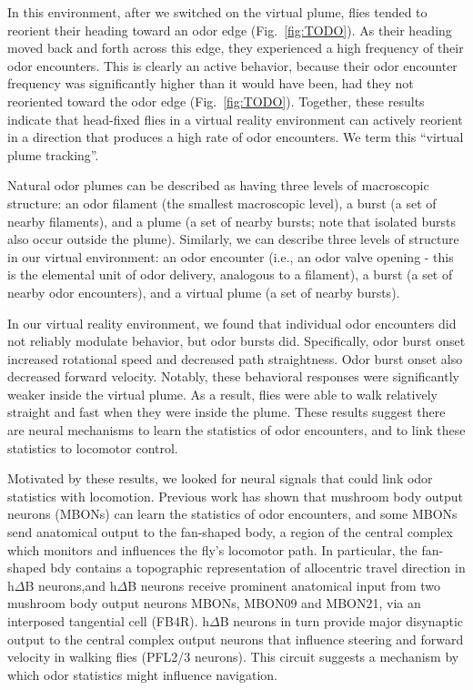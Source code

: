 In this environment, after we switched on the virtual plume, flies tended to reorient their heading toward an odor edge (Fig.~\ref{fig:TODO}). %
As their heading moved back and forth across this edge, they experienced a high frequency of their odor encounters. This is clearly an active behavior, because their odor encounter frequency was significantly higher than it would have been, had they not reoriented toward the odor edge (Fig.~\ref{fig:TODO}). %
Together, these results indicate that head-fixed flies in a virtual reality environment can actively reorient in a direction that produces a high rate of odor encounters. We term this ``virtual plume tracking''.

Natural odor plumes can be described as having three levels of macroscopic structure: an odor filament (the smallest macroscopic level), a burst (a set of nearby filaments), and a plume (a set of nearby bursts; note that isolated bursts also occur outside the plume). Similarly, we can describe three levels of structure in our virtual environment: an odor encounter (i.e., an odor valve opening - this is the elemental unit of odor delivery, analogous to a filament), a burst (a set of nearby odor encounters), and a virtual plume (a set of nearby bursts). 

In our virtual reality environment, we found that individual odor encounters did not reliably modulate behavior, but odor bursts did. Specifically, odor burst onset increased rotational speed and decreased path straightness. Odor burst onset also decreased forward velocity. Notably, these behavioral responses were significantly weaker inside the virtual plume. As a result, flies were able to walk relatively straight and fast when they were inside the plume. These results suggest there are neural mechanisms to learn the statistics of odor encounters, and to link these statistics to locomotor control. 

Motivated by these results, we looked for neural signals that could link odor statistics with locomotion. Previous work has shown that mushroom body output neurons (MBONs) can learn the statistics of odor encounters, and some MBONs send anatomical output to the fan-shaped body, a region of the central complex which monitors and influences the fly’s locomotor path. In particular, the fan-shaped bdy contains a topographic representation of allocentric travel direction in h$\Delta$B neurons,and h$\Delta$B neurons receive prominent anatomical input from two mushroom body output neurons MBONs, MBON09 and MBON21, via an interposed tangential cell (FB4R). h$\Delta$B neurons in turn provide major disynaptic output to the central complex output neurons that influence steering and forward velocity in walking flies (PFL2/3 neurons). This circuit suggests a mechanism by which odor statistics might influence navigation.

